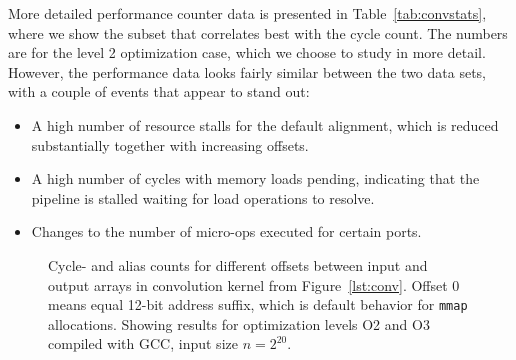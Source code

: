 \documentclass{acm_proc_article-sp}
\begin{document}
More detailed performance counter data is presented in Table~\ref{tab:convstats}, where we show the subset that correlates best with the cycle count.
The numbers are for the level 2 optimization case, which we choose to study in more detail.
However, the performance data looks fairly similar between the two data sets, with a couple of events that appear to stand out:
\begin{itemize}
    \item A high number of resource stalls for the default alignment, which is reduced substantially together with increasing offsets. 
    \item A high number of cycles with memory loads pending, indicating that the pipeline is stalled waiting for load operations to resolve.
    \item Changes to the number of micro-ops executed for certain ports.
\end{itemize}

\begin{figure}[t]
  \centering
  \caption{\label{fig:conv-default}Cycle- and alias counts for different offsets between input and output arrays in convolution kernel from Figure~\ref{lst:conv}. Offset 0 means equal 12-bit address suffix, which is default behavior for \texttt{mmap} allocations. Showing results for optimization levels O2 and O3 compiled with GCC, input size $n=2^{20}$.}
\end{figure}
\end{document}
